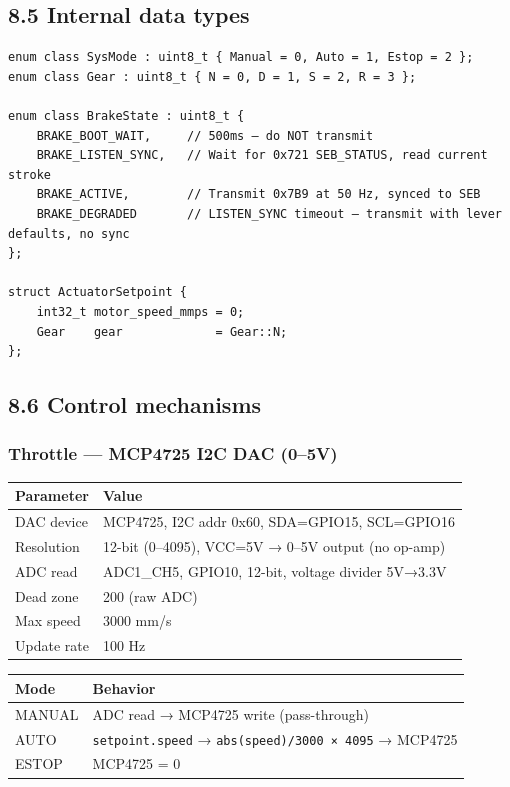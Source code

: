 \documentclass[12pt,a4paper,oneside]{report}
\begin{document}
\subsection{8.5 Internal data types}\label{internal-data-types-1}

\begin{verbatim}
enum class SysMode : uint8_t { Manual = 0, Auto = 1, Estop = 2 };
enum class Gear : uint8_t { N = 0, D = 1, S = 2, R = 3 };

enum class BrakeState : uint8_t {
    BRAKE_BOOT_WAIT,     // 500ms — do NOT transmit
    BRAKE_LISTEN_SYNC,   // Wait for 0x721 SEB_STATUS, read current stroke
    BRAKE_ACTIVE,        // Transmit 0x7B9 at 50 Hz, synced to SEB
    BRAKE_DEGRADED       // LISTEN_SYNC timeout — transmit with lever defaults, no sync
};

struct ActuatorSetpoint {
    int32_t motor_speed_mmps = 0;
    Gear    gear             = Gear::N;
};
\end{verbatim}

\subsection{8.6 Control mechanisms}\label{control-mechanisms-1}

\subsubsection{Throttle --- MCP4725 I2C DAC
(0--5V)}\label{throttle-mcp4725-i2c-dac-05v}

\begin{longtable}[]{@{}ll@{}}
\toprule\noalign{}
Parameter & Value \\
\midrule\noalign{}
\endhead
\bottomrule\noalign{}
\endlastfoot
DAC device & MCP4725, I2C addr 0x60, SDA=GPIO15, SCL=GPIO16 \\
Resolution & 12-bit (0--4095), VCC=5V → 0--5V output (no op-amp) \\
ADC read & ADC1\_CH5, GPIO10, 12-bit, voltage divider 5V→3.3V \\
Dead zone & 200 (raw ADC) \\
Max speed & 3000 mm/s \\
Update rate & 100 Hz \\
\end{longtable}

\begin{longtable}[]{@{}ll@{}}
\toprule\noalign{}
Mode & Behavior \\
\midrule\noalign{}
\endhead
\bottomrule\noalign{}
\endlastfoot
MANUAL & ADC read → MCP4725 write (pass-through) \\
AUTO & \texttt{setpoint.speed} → \texttt{abs(speed)/3000\ ×\ 4095} → MCP4725 \\
ESTOP & MCP4725 = 0 \\
\end{longtable}
\end{document}
